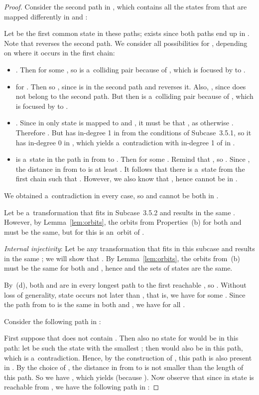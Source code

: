 \documentclass{amsart}
\begin{document}
\begin{proof}
Consider the second path in , which contains all the states from  that are mapped differently in  and :

Let  be the first common state in these paths;  exists since both paths end up in .
Note that  reverses the second path.
We consider all possibilities for , depending on where it occurs in the first chain:
\begin{itemize}
\item .
Then  for some , so  is a~colliding pair because of , which is focused by  to .
\item  for .
Then  so , since  is in the second path and  reverses it.
Also, , since  does not belong to the second path.
But then  is a~colliding pair because of , which is focused by  to .
\item .
Since in  only state  is mapped to  and , it must be that , as otherwise .
Therefore .
But  has in-degree 1 in  from the conditions of Subcase~3.5.1, so it has in-degree 0 in , which yields a~contradiction with in-degree 1 of  in .
\item  is a~state in the path in  from  to .
Then  for some .
Remind that , so .
Since , the distance in  from  to  is at least .
It follows that there is a~state  from the first chain such that .
However, we also know that , hence  cannot be in .
\end{itemize}
We obtained a~contradiction in every case, so  and  cannot be both in .

Let  be a~transformation that fits in Subcase~3.5.2 and results in the same .
However, by Lemma~\ref{lem:orbits}, the orbits from Properties~(b) for both  and  must be the same, but for  this is an~orbit of .

\textit{Internal injectivity}:
Let  be any transformation that fits in this subcase and results in the same ; we will show that .
By Lemma~\ref{lem:orbits}, the orbits from~(b) must be the same for both  and , hence  and the sets of  states are the same.

By~(d), both  and  are in every longest path to the first reachable , so .
Without loss of generality, state  occurs not later than , that is, we have  for some .
Since the path from  to  is the same in both  and , we have  for all .

Consider the following path  in :


First suppose that  does not contain .
Then also no state  for  would be in this path:
let  be such the state with the smallest ; then  would also be in this path, which is a~contradiction.
Hence, by the construction of , this path is also present in .
By the choice of , the distance in  from  to  is not smaller than the length of this path.
So we have , which yields  (because ).
Now observe that since in  state  is reachable from , we have the following path in :


\end{proof}
\end{document}
